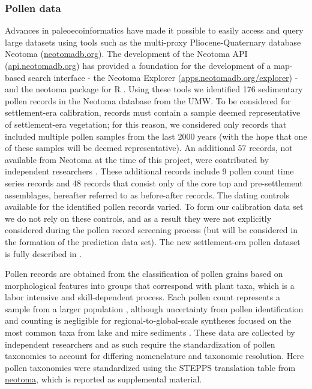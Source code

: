 \documentclass[12pt]{article}
\begin{document}


\subsubsection{Pollen data}

Advances in paleoecoinformatics \citep{brewer2012paleoecoinformatics,
  grimm2013encyclopedia} have made it possible to easily access and
query large datasets using tools such as the multi-proxy
Pliocene-Quaternary database Neotoma (\url{neotomadb.org}). The
development of the Neotoma API (\url{api.neotomadb.org}) has provided
a foundation for the development of a map-based search interface - the
Neotoma Explorer (\url{apps.neotomadb.org/explorer}) - and the neotoma
package for R \citep{goring2015}. Using these tools we identified 176
sedimentary pollen records in the Neotoma database from the UMW. To be
considered for settlement-era calibration, records must contain a
sample deemed representative of settlement-era vegetation; for this
reason, we considered only records that included multiple pollen
samples from the last 2000 years (with the hope that one of these
samples will be deemed representative). An additional 57 records, not
available from Neotoma at the time of this project, were contributed
by independent researchers \citep{kujawa2015}. These additional
records include 9 pollen count time series records and 48 records that
consist only of the core top and pre-settlement assemblages, hereafter
referred to as before-after records. The dating controls available for
the identified pollen records varied. To form our calibration data set
we do not rely on these controls, and as a result they were not
explicitly considered during the pollen record screening process (but
will be considered in the formation of the prediction data set). The
new settlement-era pollen dataset is fully described in
\citet{kujawa2015}.

Pollen records are obtained from the classification of pollen grains
based on morphological features into groups that correspond with plant
taxa, which is a labor intensive and skill-dependent process. Each
pollen count represents a sample from a larger population
\citep{maher2012assessment, maher1981statistics}, although uncertainty
from pollen identification and counting is negligible for
regional-to-global-scale syntheses focused on the most common taxa
from lake and mire sediments \citep{webb1978sensing,
  webb1978mapped}. These data are collected by independent researchers
and as such require the standardization of pollen taxonomies to
account for differing nomenclature and taxonomic resolution. Here
pollen taxonomies were standardized using the STEPPS translation table
from \url{neotoma}, which is reported as supplemental material.
\end{document}
